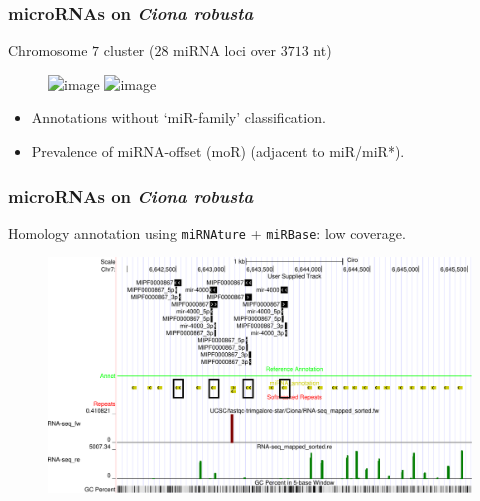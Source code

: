 \begin{frame}[t]
    \frametitle{microRNAs on \textit{Ciona robusta}}
    Chromosome $7$ cluster ($28$ miRNA loci over $3713$ nt)
    \begin{figure}[h!]
        \centering
        \includegraphics<1>[width=\linewidth]{Figures/chr7_cluster} %
        \includegraphics<2>[width=\linewidth]{Figures/mor_example} %
    \end{figure}
    \begin{itemize}[<+->]
        \item Annotations without `miR-family' classification.
        \item Prevalence of miRNA-offset (moR) (adjacent to miR/miR*).
    \end{itemize}
\end{frame}

\begin{frame}[t]
    \frametitle{microRNAs on \textit{Ciona robusta}}
    Homology annotation using \texttt{miRNAture} + \texttt{miRBase}: low coverage.
    \begin{figure}[h!]
        \centering
        \includegraphics[width=\linewidth]{Figures/homology_coverage} %
    \end{figure}
\end{frame}
